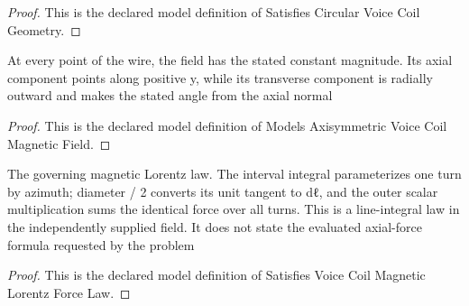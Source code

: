 \begin{proof}
  This is the declared model definition of Satisfies Circular Voice Coil Geometry.
\end{proof}
\begin{definition}
  \label{def:physics:phyx-mini-0950:phyxminiproblems-problemphyxmini0950-modelsaxisymmetricvoicecoilmagneticfield}
  At every point of the wire, the field has the stated constant magnitude. Its axial component points along positive y, while its transverse component is radially outward and makes the stated angle from the axial normal
\end{definition}
\begin{proof}
  This is the declared model definition of Models Axisymmetric Voice Coil Magnetic Field.
\end{proof}
\begin{definition}
  \label{def:physics:phyx-mini-0950:phyxminiproblems-problemphyxmini0950-satisfiesvoicecoilmagneticlorentzforcelaw}
  The governing magnetic Lorentz law. The interval integral parameterizes one turn by azimuth; diameter / 2 converts its unit tangent to dℓ, and the outer scalar multiplication sums the identical force over all turns. This is a line-integral law in the independently supplied field. It does not state the evaluated axial-force formula requested by the problem
\end{definition}
\begin{proof}
  This is the declared model definition of Satisfies Voice Coil Magnetic Lorentz Force Law.
\end{proof}
